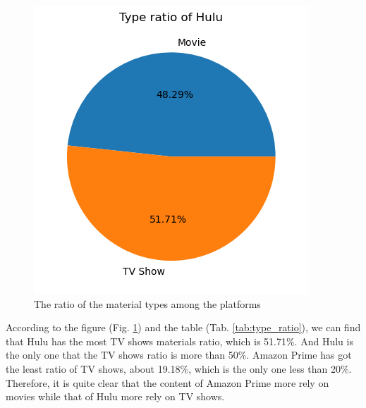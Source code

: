 \documentclass{article}
\begin{document}
\begin{figure}[!htb]
{\begin{minipage}[t]{0.45\linewidth}
			\centering
			\includegraphics[scale=0.6]{../type_ratio/Hulu_type_ratio.png}
		\end{minipage}
	}
	\caption{The ratio of the material types among the platforms}
	\label{fig:type_ratio}
\end{figure}
	
According to the figure (Fig. \ref{fig:type_ratio}) and the table 
(Tab. \ref{tab:type_ratio}), we can find that Hulu has the most TV shows materials 
ratio, which is 51.71\%. And Hulu is the only one that the TV shows ratio is more 
than 50\%. Amazon Prime has got the least ratio of TV shows, about 19.18\%, which 
is the only one less than 20\%. Therefore, it is quite clear that the content of 
Amazon Prime more rely on movies while that of Hulu more rely on TV shows.
\end{document}
